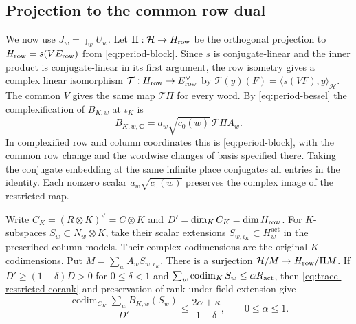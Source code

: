 \subsection{Projection to the common row dual}
\leavevmode{}%
We now use \(J_w=\jmath_wU_w\). Let \(\Pi:\mathcal H\to H_{\rm row}\)
be the orthogonal projection to \(H_{\rm row}=s(VE_{\rm row})\)
from \eqref{eq:period-block}. Since \(s\) is conjugate-linear and the
inner product is conjugate-linear in its first argument, the row
isometry gives a complex linear isomorphism
\(\mathcal T:H_{\rm row}\to E_{\rm row}^{\vee}\)
by \(\mathcal T(y)(F)=\langle s(VF),y\rangle_{\mathcal H}\).
The common \(V\) gives the same map \(\mathcal T\Pi\) for every
word. By \eqref{eq:period-bessel} the complexification of
\(B_{K,w}\) at \(\iota_K\) is
\[
 B_{K,w,\mathbf C}=a_w\sqrt{c_0(w)}\,\mathcal T\Pi A_w .
\]
In complexified row and column coordinates this is
\eqref{eq:period-block}, with the common row change and the
wordwise changes of basis specified there.
Taking the conjugate embedding at the same infinite place conjugates
all entries in the identity. Each nonzero scalar
\(a_w\sqrt{c_0(w)}\) preserves the complex image of the restricted map.

Write \(C_K=(R\otimes K)^\vee=C\otimes K\) and
\(D'=\dim_K C_K=\dim H_{\rm row}\).
For \(K\)-subspaces \(S_w\subset N_w\otimes K\), take their scalar
extensions \(S_{w,\iota_K}\subset H_w^{\mathrm{act}}\) in the prescribed
column models. Their complex codimensions are the original
\(K\)-codimensions. Put \(M=\sum_w A_wS_{w,\iota_K}\).
There is a surjection \(\mathcal H/M\to H_{\rm row}/\Pi M\).
If \(D'\ge(1-\delta)D>0\) for \(0\le\delta<1\) and
\(\sum_w\operatorname{codim}_K S_w\le\alpha R_{\rm act}\), then
\eqref{eq:trace-restricted-corank} and preservation of rank under
field extension give
\begin{equation}
 \label{eq:trace-rational-corank}
 \frac{\operatorname{codim}_{C_K}\sum_w B_{K,w}(S_w)}{D'}
 \le \frac{2\alpha+\kappa}{1-\delta},
 \qquad 0\le\alpha\le1 .
\end{equation}
